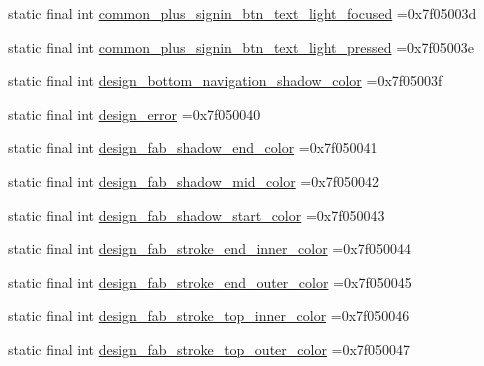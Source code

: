 \begin{DoxyCompactItemize}
\item 
static final int \mbox{\hyperlink{classbr_1_1unb_1_1cic_1_1mp_1_1marketmaster_1_1test_1_1R_1_1color_ac4a621c599670dcc27dd33a97832a0f8}{common\+\_\+plus\+\_\+signin\+\_\+btn\+\_\+text\+\_\+light\+\_\+focused}} =0x7f05003d
\item 
static final int \mbox{\hyperlink{classbr_1_1unb_1_1cic_1_1mp_1_1marketmaster_1_1test_1_1R_1_1color_aa6d3b1e60a7743724fe3dc1efaff1ce6}{common\+\_\+plus\+\_\+signin\+\_\+btn\+\_\+text\+\_\+light\+\_\+pressed}} =0x7f05003e
\item 
static final int \mbox{\hyperlink{classbr_1_1unb_1_1cic_1_1mp_1_1marketmaster_1_1test_1_1R_1_1color_ad88087887a4578d771c98b04273c0695}{design\+\_\+bottom\+\_\+navigation\+\_\+shadow\+\_\+color}} =0x7f05003f
\item 
static final int \mbox{\hyperlink{classbr_1_1unb_1_1cic_1_1mp_1_1marketmaster_1_1test_1_1R_1_1color_a59c6aa1bc4bf8f22c9b2107ad0dcb5e5}{design\+\_\+error}} =0x7f050040
\item 
static final int \mbox{\hyperlink{classbr_1_1unb_1_1cic_1_1mp_1_1marketmaster_1_1test_1_1R_1_1color_aa1ffec8a217b700526fe20730e17c83e}{design\+\_\+fab\+\_\+shadow\+\_\+end\+\_\+color}} =0x7f050041
\item 
static final int \mbox{\hyperlink{classbr_1_1unb_1_1cic_1_1mp_1_1marketmaster_1_1test_1_1R_1_1color_a35d3a24ac667ce3a7909c9db749f0741}{design\+\_\+fab\+\_\+shadow\+\_\+mid\+\_\+color}} =0x7f050042
\item 
static final int \mbox{\hyperlink{classbr_1_1unb_1_1cic_1_1mp_1_1marketmaster_1_1test_1_1R_1_1color_a957083f69486ac374c9962f38bab31ec}{design\+\_\+fab\+\_\+shadow\+\_\+start\+\_\+color}} =0x7f050043
\item 
static final int \mbox{\hyperlink{classbr_1_1unb_1_1cic_1_1mp_1_1marketmaster_1_1test_1_1R_1_1color_ac1ef2e37698100678fa4619c1bec1e08}{design\+\_\+fab\+\_\+stroke\+\_\+end\+\_\+inner\+\_\+color}} =0x7f050044
\item 
static final int \mbox{\hyperlink{classbr_1_1unb_1_1cic_1_1mp_1_1marketmaster_1_1test_1_1R_1_1color_a3ea822580b9995cb3157f72f22a90a78}{design\+\_\+fab\+\_\+stroke\+\_\+end\+\_\+outer\+\_\+color}} =0x7f050045
\item 
static final int \mbox{\hyperlink{classbr_1_1unb_1_1cic_1_1mp_1_1marketmaster_1_1test_1_1R_1_1color_a49a2f877fb111ff6ede121cf7d3fa287}{design\+\_\+fab\+\_\+stroke\+\_\+top\+\_\+inner\+\_\+color}} =0x7f050046
\item 
static final int \mbox{\hyperlink{classbr_1_1unb_1_1cic_1_1mp_1_1marketmaster_1_1test_1_1R_1_1color_a2109d3f9db24eaea728accc95ea9f145}{design\+\_\+fab\+\_\+stroke\+\_\+top\+\_\+outer\+\_\+color}} =0x7f050047

\end{DoxyCompactItemize}
